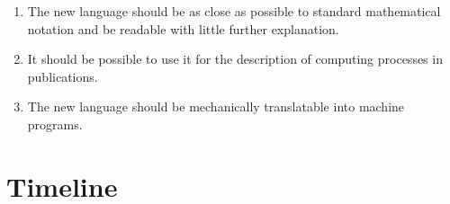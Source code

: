 \begin{enumerate}
\item The new language should be as close as possible to standard mathematical 
      notation and be readable with little further explanation.
\item It should be possible to use it for the description of computing processes in publications.
\item The new language should be mechanically translatable into machine programs.
\end{enumerate}

\pagebreak
\section{Timeline}


